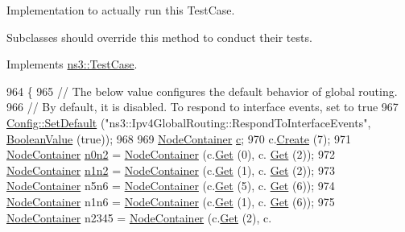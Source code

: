 Implementation to actually run this Test\+Case. 

Subclasses should override this method to conduct their tests. 

Implements \hyperlink{classns3_1_1TestCase_a8ff74680cf017ed42011e4be51917a24}{ns3\+::\+Test\+Case}.


\begin{DoxyCode}
964 \{
965   \textcolor{comment}{// The below value configures the default behavior of global routing.}
966   \textcolor{comment}{// By default, it is disabled.  To respond to interface events, set to true}
967   \hyperlink{group__config_ga2e7882df849d8ba4aaad31c934c40c06}{Config::SetDefault} (\textcolor{stringliteral}{"ns3::Ipv4GlobalRouting::RespondToInterfaceEvents"}, 
      \hyperlink{classns3_1_1BooleanValue}{BooleanValue} (\textcolor{keyword}{true}));
968 
969   \hyperlink{classns3_1_1NodeContainer}{NodeContainer} \hyperlink{lte_2model_2fading-traces_2fading__trace__generator_8m_ae0323a9039add2978bf5b49550572c7c}{c};
970   c.\hyperlink{classns3_1_1NodeContainer_a787f059e2813e8b951cc6914d11dfe69}{Create} (7);
971   \hyperlink{classns3_1_1NodeContainer}{NodeContainer} \hyperlink{adaptive-red-tests_8cc_aeaa87dbd052b50719525adea0f586b36}{n0n2} = \hyperlink{classns3_1_1NodeContainer}{NodeContainer} (c.\hyperlink{classns3_1_1NodeContainer_a9ed96e2ecc22e0f5a3d4842eb9bf90bf}{Get} (0), c.
      \hyperlink{classns3_1_1NodeContainer_a9ed96e2ecc22e0f5a3d4842eb9bf90bf}{Get} (2));
972   \hyperlink{classns3_1_1NodeContainer}{NodeContainer} \hyperlink{adaptive-red-tests_8cc_a68f69f65725cbe7529e8b594708b8fc0}{n1n2} = \hyperlink{classns3_1_1NodeContainer}{NodeContainer} (c.\hyperlink{classns3_1_1NodeContainer_a9ed96e2ecc22e0f5a3d4842eb9bf90bf}{Get} (1), c.
      \hyperlink{classns3_1_1NodeContainer_a9ed96e2ecc22e0f5a3d4842eb9bf90bf}{Get} (2));
973   \hyperlink{classns3_1_1NodeContainer}{NodeContainer} n5n6 = \hyperlink{classns3_1_1NodeContainer}{NodeContainer} (c.\hyperlink{classns3_1_1NodeContainer_a9ed96e2ecc22e0f5a3d4842eb9bf90bf}{Get} (5), c.
      \hyperlink{classns3_1_1NodeContainer_a9ed96e2ecc22e0f5a3d4842eb9bf90bf}{Get} (6));
974   \hyperlink{classns3_1_1NodeContainer}{NodeContainer} n1n6 = \hyperlink{classns3_1_1NodeContainer}{NodeContainer} (c.\hyperlink{classns3_1_1NodeContainer_a9ed96e2ecc22e0f5a3d4842eb9bf90bf}{Get} (1), c.
      \hyperlink{classns3_1_1NodeContainer_a9ed96e2ecc22e0f5a3d4842eb9bf90bf}{Get} (6));
975   \hyperlink{classns3_1_1NodeContainer}{NodeContainer} n2345 = \hyperlink{classns3_1_1NodeContainer}{NodeContainer} (c.\hyperlink{classns3_1_1NodeContainer_a9ed96e2ecc22e0f5a3d4842eb9bf90bf}{Get} (2), c.

\end{DoxyCode}
